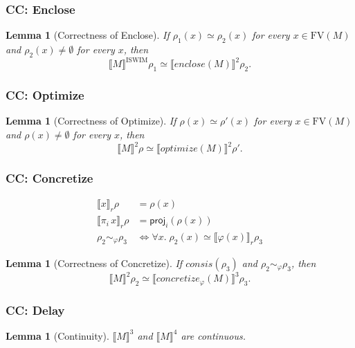 \documentclass[10pt]{article}
\theoremstyle{acmplain}
\newtheorem{lemma}[theorem]{Lemma}
\newcommand{\SEM}[1]{\llbracket #1 \rrbracket}
\newcommand{\key}[1]{\mathsf{#1}}
\newcommand{\pass}[1]{\mathit{#1}}
\newcommand{\prj}[1]{\pi_{#1}\,}
\newcommand{\FV}{\mathrm{FV}}
\newcommand{\NE}{\neq\emptyset}
\newcommand{\consis}{\mathit{consis}}
\begin{document}
\subsubsection{CC: Enclose}

\begin{lemma}[Correctness of Enclose]\label{lem:enclose}
If $\rho_1(x) \simeq \rho_2(x)$ for every $x \in \FV(M)$
and $\rho_2(x) \NE$ for every $x$, then
\[
  \SEM{M}^{\mathrm{ISWIM}}\rho_1 \simeq \SEM{\pass{enclose}(M)}^{\mathrm{2}}\rho_2 .
\]
\end{lemma}

\subsubsection{CC: Optimize}

\begin{lemma}[Correctness of Optimize]\label{lem:optimize}
If $\rho(x) \simeq \rho'(x)$ for every $x \in \FV(M)$
and $\rho(x) \NE$ for every $x$, then
\[
  \SEM{M}^{\mathrm{2}}\rho \simeq \SEM{\pass{optimize}(M)}^{\mathrm{2}}\rho' .
\]
\end{lemma}

\subsubsection{CC: Concretize}

\begin{align*}
  \SEM{x}_r\rho &= \rho(x) \\
  \SEM{\prj{i} x}_r\rho &= \key{proj}_i(\rho(x)) \\[1ex]
  \rho_2 \sim_\varphi \rho_3 &\iff \forall x.\; \rho_2(x) \simeq \SEM{\varphi(x)}_r\rho_3
\end{align*}
\begin{lemma}[Correctness of Concretize]\label{lem:concretize}
If $\consis(\rho_3)$ and $\rho_2 \sim_\varphi \rho_3$, then
\[
  \SEM{M}^{\mathrm{2}}\rho_2 \simeq \SEM{\pass{concretize}_\varphi(M)}^{\mathrm{3}}\rho_3 .
\]
\end{lemma}

\subsubsection{CC: Delay}

\begin{lemma}[Continuity]\label{lem:continuity}
$\SEM{M}^{\mathrm{3}}$ and $\SEM{M}^{\mathrm{4}}$ are continuous.
\end{lemma}
\end{document}
